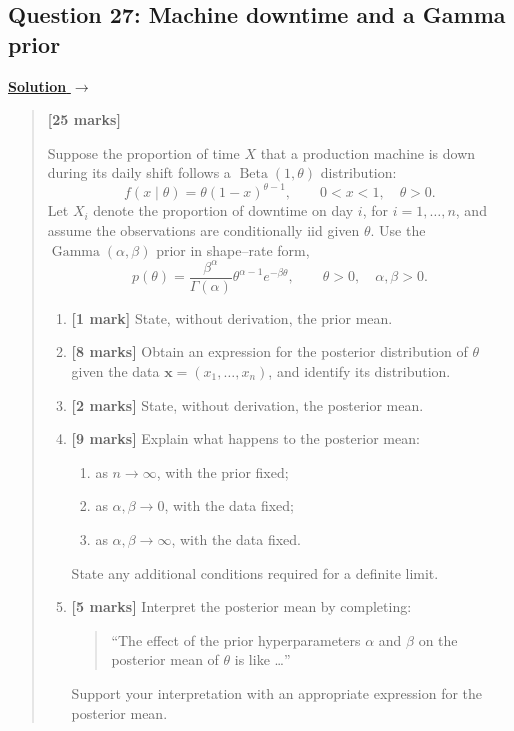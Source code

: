\documentclass[11pt,a4paper]{article}
\newcommand{\xvec}{\boldsymbol{x}}
\newenvironment{examquestion}[2]
  {\subsection{#1}\label{question:\arabic{subsection}}\label{#2}%
   \noindent\hyperref[answer:\arabic{subsection}]{\textbf{Solution} $\rightarrow$}%
   \begin{quote}\color{statgrey}}
  {\end{quote}}
\begin{document}
\clearpage

\begin{examquestion}{Question 27: Machine downtime and a Gamma prior}{question:practice-machine-downtime-and-a-gamma-prior}
\textbf{[25 marks]}

Suppose the proportion of time $X$ that a production machine is down during
its daily shift follows a $\operatorname{Beta}(1,\theta)$ distribution:
\[
f(x\mid\theta)=\theta(1-x)^{\theta-1},
\qquad 0<x<1,\quad\theta>0.
\]
Let $X_i$ denote the proportion of downtime on day $i$, for $i=1,\ldots,n$,
and assume the observations are conditionally iid given $\theta$.
Use the $\operatorname{Gamma}(\alpha,\beta)$ prior in shape--rate form,
\[
p(\theta)=\frac{\beta^\alpha}{\Gamma(\alpha)}
\theta^{\alpha-1}e^{-\beta\theta},
\qquad\theta>0,\quad\alpha,\beta>0.
\]
\begin{enumerate}[label=(\alph*)]
  \item \textbf{[1 mark]} State, without derivation, the prior mean.
  \item \textbf{[8 marks]} Obtain an expression for the posterior
        distribution of $\theta$ given the data
        $\xvec=(x_1,\ldots,x_n)$, and identify its distribution.
  \item \textbf{[2 marks]} State, without derivation, the posterior mean.
  \item \textbf{[9 marks]} Explain what happens to the posterior mean:
        \begin{enumerate}[label=(\roman*)]
          \item as $n\to\infty$, with the prior fixed;
          \item as $\alpha,\beta\to0$, with the data fixed;
          \item as $\alpha,\beta\to\infty$, with the data fixed.
        \end{enumerate}
        State any additional conditions required for a definite limit.
  \item \textbf{[5 marks]} Interpret the posterior mean by completing:
        \begin{quote}
        ``The effect of the prior hyperparameters $\alpha$ and $\beta$
        on the posterior mean of $\theta$ is like \ldots''
        \end{quote}
        Support your interpretation with an appropriate expression for
        the posterior mean.
\end{enumerate}
\end{examquestion}

\clearpage
\end{document}
